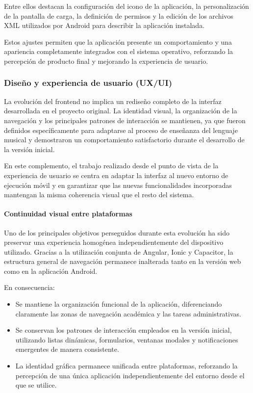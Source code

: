 Entre ellos destacan la configuración del icono de la aplicación, la personalización de la pantalla de carga, la definición de permisos y la edición de los archivos XML utilizados por Android para describir la aplicación instalada.

Estos ajustes permiten que la aplicación presente un comportamiento y una apariencia completamente integrados con el sistema operativo, reforzando la percepción de producto final y mejorando la experiencia de usuario.

\subsubsection{Diseño y experiencia de usuario (UX/UI)}
\label{sec:frontend_diseno_ext}

La evolución del frontend no implica un rediseño completo de la interfaz desarrollada en el proyecto original. La identidad visual, la organización de la navegación y los principales patrones de interacción se mantienen, ya que fueron definidos específicamente para adaptarse al proceso de enseñanza del lenguaje musical y demostraron un comportamiento satisfactorio durante el desarrollo de la versión inicial.

En este complemento, el trabajo realizado desde el punto de vista de la experiencia de usuario se centra en adaptar la interfaz al nuevo entorno de ejecución móvil y en garantizar que las nuevas funcionalidades incorporadas mantengan la misma coherencia visual que el resto del sistema.

\paragraph{Continuidad visual entre plataformas}

Uno de los principales objetivos perseguidos durante esta evolución ha sido preservar una experiencia homogénea independientemente del dispositivo utilizado. Gracias a la utilización conjunta de Angular, Ionic y Capacitor, la estructura general de navegación permanece inalterada tanto en la versión web como en la aplicación Android.

En consecuencia:

\begin{itemize}
    \item Se mantiene la organización funcional de la aplicación, diferenciando claramente las zonas de navegación académica y las tareas administrativas.
    \item Se conservan los patrones de interacción empleados en la versión inicial, utilizando listas dinámicas, formularios, ventanas modales y notificaciones emergentes de manera consistente.
    \item La identidad gráfica permanece unificada entre plataformas, reforzando la percepción de una única aplicación independientemente del entorno desde el que se utilice.
\end{itemize}

